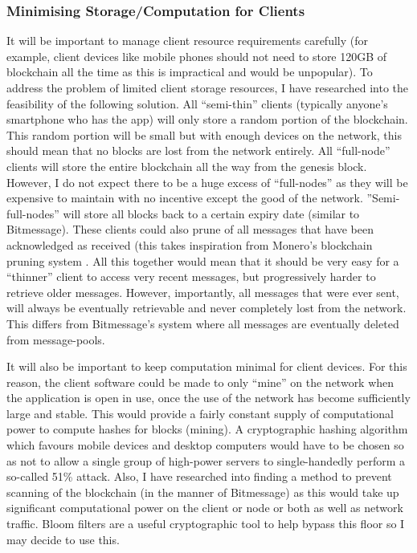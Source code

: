 \documentclass{article}
\begin{document}
\subsubsection{Minimising Storage/Computation for Clients}
It will be important to manage client resource requirements carefully (for example, client devices like mobile phones should not need to store 120GB of blockchain all the time as this is impractical and would be unpopular). To address the problem of limited client storage resources, I have researched into the feasibility of the following solution. All ``semi-thin'' clients (typically anyone's smartphone who has the app) will only store a random portion of the blockchain. This random portion will be small but with enough devices on the network, this should mean that no blocks are lost from the network entirely. All ``full-node'' clients will store the entire blockchain all the way from the genesis block. However, I do not expect there to be a huge excess of ``full-nodes'' as they will be expensive to maintain with no incentive except the good of the network.
''Semi-full-nodes'' will store all blocks back to a certain expiry date (similar to Bitmessage). These clients could also prune of all messages that have been acknowledged as received (this takes inspiration from Monero's blockchain pruning system \cite{monero_pruning}. All this together would mean that it should be very easy for a ``thinner'' client to access very recent messages, but progressively harder to retrieve older messages. However, importantly, all messages that were ever sent, will always be eventually retrievable and never completely lost from the network. This differs from Bitmessage's system where all messages are eventually deleted from message-pools.

It will also be important to keep computation minimal for client devices. For this reason, the client software could be made to only ``mine'' on the network when the application is open in use, once the use of the network has become sufficiently large and stable. This would provide a fairly constant supply of computational power to compute hashes for blocks (mining). A cryptographic hashing algorithm which favours mobile devices and desktop computers would have to be chosen so as not to allow a single group of high-power servers to single-handedly perform a so-called 51\% attack\cite{51_attack}. Also, I have researched into finding a method to prevent scanning of the blockchain (in the manner of Bitmessage) as this would take up significant computational power on the client or node or both as well as network traffic. Bloom filters are a useful cryptographic tool to help bypass this floor so I may decide to use this.
\end{document}
